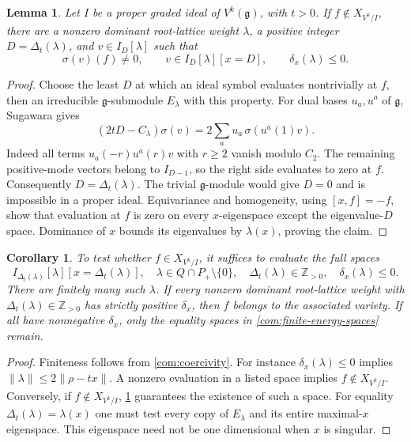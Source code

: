 \documentclass[11pt,a4paper]{amsart}
\numberwithin{equation}{section}
\newtheorem{lemma}[theorem]{Lemma}
\newtheorem{corollary}[theorem]{Corollary}
\theoremstyle{definition}
\theoremstyle{remark}
\newcommand{\Z}{\mathbb Z}
\newcommand{\g}{\mathfrak g}
\begin{document}
\begin{lemma}\label{com:energy}
Let $I$ be a proper graded ideal of $V^k(\g)$, with $t>0$.
If $f\notin X_{V^k/I}$, there are a nonzero dominant root-lattice
weight $\lambda$, a positive integer $D=\Delta_t(\lambda)$, and
$v\in I_D[\lambda]$ such that
$$
 \sigma(v)(f)\ne0,\qquad v\in I_D[\lambda][x=D],\qquad
                       \delta_x(\lambda)\le0.
$$
\end{lemma}
\begin{proof}
Choose the least $D$ at which an ideal symbol evaluates nontrivially
at $f$, then an irreducible $\g$-submodule $E_\lambda$ with
this property. For dual bases $u_a,u^a$ of $\g$, Sugawara gives
\begin{equation}\label{com:ideal-sugawara}
 (2tD-C_\lambda)\sigma(v)
       =2\sum_a u_a\,\sigma(u^a(1)v).
\end{equation}
Indeed all terms $u_a(-r)u^a(r)v$ with $r\ge2$ vanish modulo
$C_2$. The remaining positive-mode vectors belong to $I_{D-1}$,
so the right side evaluates to zero at $f$. Consequently
$D=\Delta_t(\lambda)$. The trivial $\g$-module would give
$D=0$ and is impossible in a proper ideal. Equivariance and
homogeneity, using $[x,f]=-f$, show that evaluation at $f$ is zero
on every $x$-eigenspace except the eigenvalue-$D$ space. Dominance
of $x$ bounds its eigenvalues by $\lambda(x)$, proving the claim.
\end{proof}

\begin{corollary}\label{com:equality}
To test whether $f\in X_{V^k/I}$, it suffices to evaluate the
full spaces
\begin{equation}\label{com:finite-energy-spaces}
 I_{\Delta_t(\lambda)}[\lambda][x=\Delta_t(\lambda)],
 \quad
 \lambda\in Q\cap P_+\setminus\{0\},\quad
 \Delta_t(\lambda)\in\Z_{>0},\quad\delta_x(\lambda)\le0.
\end{equation}
There are finitely many such $\lambda$. If every nonzero dominant
root-lattice weight with $\Delta_t(\lambda)\in\Z_{>0}$ has
strictly positive $\delta_x$, then
$f$ belongs to the associated variety. If all have nonnegative
$\delta_x$, only the equality spaces in
\eqref{com:finite-energy-spaces} remain.
\end{corollary}
\begin{proof}
Finiteness follows from \eqref{com:coercivity}. For instance
$\delta_x(\lambda)\le0$ implies
$\|\lambda\|\le2\|\rho-tx\|$. A nonzero evaluation in a listed
space implies $f\notin X_{V^k/I}$. Conversely, if $f\notin X_{V^k/I}$,
\cref{com:energy} guarantees the existence of such a space. For equality
$\Delta_t(\lambda)=\lambda(x)$ one must test every copy of
$E_\lambda$ and its entire maximal-$x$ eigenspace. This eigenspace
need not be one dimensional when $x$ is singular.
\end{proof}
\end{document}
